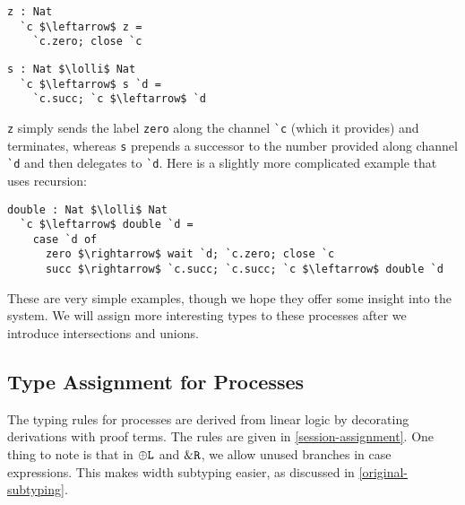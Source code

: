 \documentclass[submission,copyright,creativecommons]{eptcs}
\begin{document}
\begin{minipage}{.40\textwidth}
\begin{lstlisting}[language=krill, style=custom]
  z : Nat
  `c $\leftarrow$ z =
    `c.zero; close `c
\end{lstlisting}
\end{minipage}
\hfill
\begin{minipage}{.40\textwidth}
\begin{lstlisting}[language=krill, style=custom]
  s : Nat $\lolli$ Nat
  `c $\leftarrow$ s `d =
    `c.succ; `c $\leftarrow$ `d
\end{lstlisting}
\end{minipage}

\lstinline{z} simply sends the label \lstinline{zero} along the channel \lstinline{`c} (which it provides) and terminates, whereas \lstinline{s} prepends a successor to the number provided along channel \lstinline{`d} and then delegates to \lstinline{`d}. Here is a slightly more complicated example that uses recursion:

\begin{lstlisting}[language=krill, style=custom]
  double : Nat $\lolli$ Nat
  `c $\leftarrow$ double `d =
    case `d of
      zero $\rightarrow$ wait `d; `c.zero; close `c
      succ $\rightarrow$ `c.succ; `c.succ; `c $\leftarrow$ double `d
\end{lstlisting}

These are very simple examples, though we hope they offer some insight into the system. We will assign more interesting types to these processes after we introduce intersections and unions.


\subsection{Type Assignment for Processes}

The typing rules for processes are derived from linear logic by decorating derivations with proof terms. The rules are given in \cref{session-assignment}. One thing to note is that in $\oplus\texttt{L}$ and $\&\texttt{R}$, we allow unused branches in case expressions. This makes width subtyping easier, as discussed in \cref{original-subtyping}.
\end{document}

